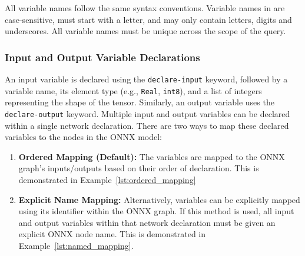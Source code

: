 All variable names follow the same syntax conventions. Variable names in \vnnlib{} are case-sensitive, must start with a letter, and may only contain letters, digits and underscores. All variable names must
be unique across the scope of the \vnnlib{} query. 


\subsubsection*{Input and Output Variable Declarations}
\label{sec:input-output-declarations}
An input variable is declared using the \texttt{declare-input} keyword, followed by a variable name, its element type (e.g., \texttt{Real}, \texttt{int8}), 
and a list of integers representing the shape of the tensor. Similarly, an output variable uses the \texttt{declare-output} keyword. Multiple 
input and output variables can be declared within a single network declaration. There are two ways to map these declared variables to the nodes in the ONNX model:
\begin{enumerate}
    \item \textbf{Ordered Mapping (Default):} The variables are mapped to the ONNX graph's inputs/outputs based on their order of declaration. This is demonstrated in Example~\ref{lst:ordered_mapping}
    \item \textbf{Explicit Name Mapping:} Alternatively, variables can be explicitly mapped using its identifier within the ONNX graph. If this method is used, all input and output 
        variables within that network declaration must be given an explicit ONNX node name. This is demonstrated in Example~\ref{lst:named_mapping}.
\end{enumerate}

